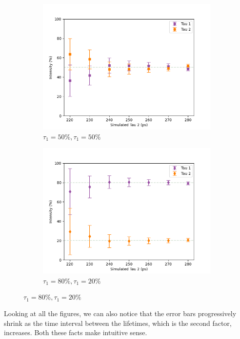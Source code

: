 \begin{figure}[H]
{\begin{subfigure}{.7\textwidth}
        \includegraphics[width=0.95\linewidth]{Batch 1+2/5050.png}
        \caption{$\tau_1 = 50\%, \tau_1 = 50\%$}
        \label{fig:180-5050}
    \end{subfigure}
    \begin{subfigure}{.7\textwidth}
        \centering
        \includegraphics[width=0.95\linewidth]{Batch 1+2/8020.png}
        \caption{$\tau_1 = 80\%, \tau_1 = 20\%$}
        \label{fig:180-8020}
    \end{subfigure}
    }
\end{figure}

Looking at all the figures, we can also notice that the error bars progressively shrink as the time interval between the lifetimes, which is the second factor, increases. Both these facts make intuitive sense.

